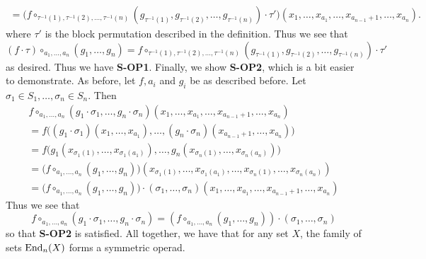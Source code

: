 \begin{example}
\begin{gather*}
        =
        \Big(f \circ_{\tau^{-1}(1), \tau^{-1}(2), \dots, \tau^{-1}(n)}(g_{\tau^{-1}(1)}, g_{\tau^{-1}(2)}, \dots, g_{\tau^{-1}(n)}) \cdot \tau'\Big)(x_1, \dots, x_{a_1}, \dots, x_{a_{n-1}+1}, \dots, x_{a_n}).
    \end{gather*}
    where $\tau'$ is the block permutation described in the definition. 
    Thus we see that 
    \[
        (f \cdot \tau) \circ_{a_1, \dots, a_n}(g_1, \dots, g_n)
        =
        f \circ_{\tau^{-1}(1), \tau^{-1}(2), \dots, \tau^{-1}(n)}(g_{\tau^{-1}(1)}, g_{\tau^{-1}(2)}, \dots, g_{\tau^{-1}(n)}) \cdot \tau'
    \]
    as desired. Thus we have \textbf{S-OP1}. Finally, we show \textbf{S-OP2}, which 
    is a bit easier to demonstrate. As before, let $f, a_i$ and $g_i$ be as described 
    before. Let $\sigma_1 \in S_1, \dots, \sigma_n \in S_n$. 
    Then 
    \begin{gather*}
        f \circ_{a_1, \dots, a_n}(g_1 \cdot \sigma_1, \dots, g_n \cdot \sigma_n)(x_1, \dots, x_{a_1}, \dots, x_{a_{n-1}+1}, \dots, x_{a_n})\\
        =
        f\Big( (g_1 \cdot \sigma_1)(x_1, \dots, x_{a_1}), \dots, (g_n \cdot \sigma_n)(x_{a_{n-1}+1}, \dots, x_{a_n})  \Big)\\
        =
        f\Big( g_1(x_{\sigma_1(1)}, \dots, x_{\sigma_1(a_1)}), \dots, g_n(x_{\sigma_n(1)}, \dots, x_{\sigma_n(a_n)}) \Big)\\
        = 
        \Big( f \circ_{a_1, \dots, a_n}(g_1, \dots, g_n) \Big)(x_{\sigma_1(1)}, \dots, x_{\sigma_1(a_1)}, \dots, x_{\sigma_n(1)}, \dots, x_{\sigma_n(a_n)})\\
        = 
        \Big( f \circ_{a_1, \dots, a_n}(g_1, \dots, g_n) \Big) \cdot (\sigma_1, \dots, \sigma_n)(x_1, \dots, x_{a_1}, \dots, x_{a_{n-1}+1}, \dots, x_{a_n})
    \end{gather*}
    Thus we see that 
    \[
        f \circ_{a_1, \dots, a_n}(g_1 \cdot \sigma_1, \dots, g_n \cdot \sigma_n)
        =(f \circ_{a_1, \dots, a_n}(g_1, \dots, g_n)) \cdot (\sigma_1, \dots, \sigma_n)
    \]
    so that \textbf{S-OP2} is satisfied. 
    All together, we have that for any set $X$, the family of sets $\operatorname{\mathrm{End}}_{n}(X)$ 
    forms a symmetric operad.
\end{example}


